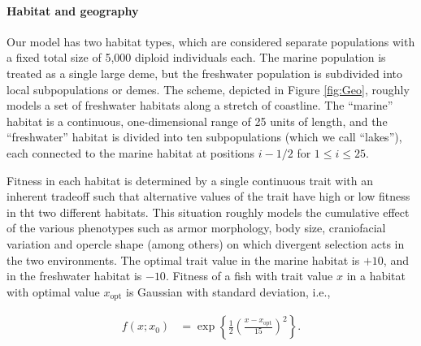 \documentclass{article}
\begin{document}
\paragraph{Habitat and geography}
Our model has two habitat types, which are considered separate populations with a fixed total size of 5,000 diploid individuals each. 
The marine population is treated as a single large deme, but the freshwater population is subdivided into local subpopulations or demes. 
The scheme, depicted in Figure \ref{fig:Geo}, roughly models a set of freshwater habitats along a stretch of coastline. 
The ``marine'' habitat  is a continuous, one-dimensional range of 25 units of length, and the 
``freshwater'' habitat is divided into ten subpopulations (which we call ``lakes''), each connected to the marine habitat at positions $i - 1/2$ for $1 \le i \le 25$.

Fitness in each habitat is determined by a single continuous trait with an inherent tradeoff such that alternative values of the trait have high or low fitness in tht two different habitats. 
This situation roughly models the cumulative effect of the various phenotypes such as armor morphology, 
body size, craniofacial variation and opercle shape (among others) on which divergent selection acts in the two environments. 
The optimal trait value in the marine habitat is $+10$, and in the freshwater habitat is $-10$. 
Fitness of a fish with trait value $x$ in a habitat with optimal value $x_\text{opt}$ is Gaussian with standard deviation, i.e.,

\begin{align*}
    f(x; x_0)
    &=
    \exp\left\{
        \frac{1}{2}
            \left(
            \frac{x-x_\text{opt}}{15}
            \right)^2
        \right\} .
\end{align*}
\end{document}
